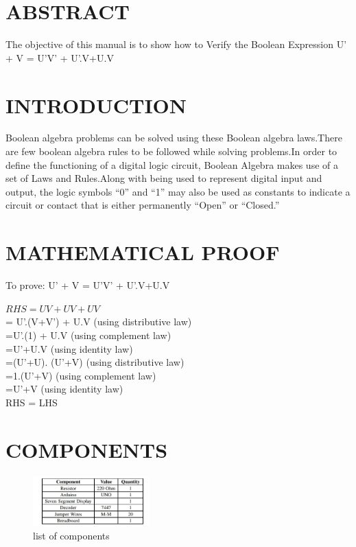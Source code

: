 \documentclass[10pt, a4paper]{article}
\title{\mytitle}
\author{\myauthor\hspace{1em}\\\contact\\IITH\hspace{0.5em}-\hspace{0.5em}\mymodule}
\date{}
\begin{document}
  \maketitle
\tableofcontents


\section{ABSTRACT}

The objective of this manual is to show how to Verify the
Boolean Expression U' + V = U'V' + U'.V+U.V
\section{INTRODUCTION}

Boolean algebra problems can be solved using these Boolean algebra laws.There are few boolean algebra rules to be followed while solving problems.In order to define the functioning of a digital logic circuit, Boolean Algebra makes use of a set of Laws and Rules.Along with being used to represent digital input and output, the logic symbols “0” and “1” may also be used as constants to indicate a circuit or contact that is either permanently “Open” or “Closed.”



\section{MATHEMATICAL PROOF}

To prove: U' + V = U'V' + U'.V+U.V

  $ RHS	=UV+UV+UV $
    \\   = U'.(V+V') + U.V    (using distributive law)
    \\    =U'.(1) + U.V	 (using complement law)
	  \\  =U'+U.V		    (using identity law)
	   \\ =(U'+U). (U'+V)	(using distributive law)
	   \\ =1.(U'+V)		(using complement law)
	    \\=U'+V			(using identity law)\\
 RHS	= LHS       

\section{COMPONENTS}
\begin{figure}[h]
    \centering
    \includegraphics[width=0.4\textwidth]{Components.jpg}
    \caption{list of components}
    \label{fig:my_label}
     \end{figure}
\newpage
\end{document}
